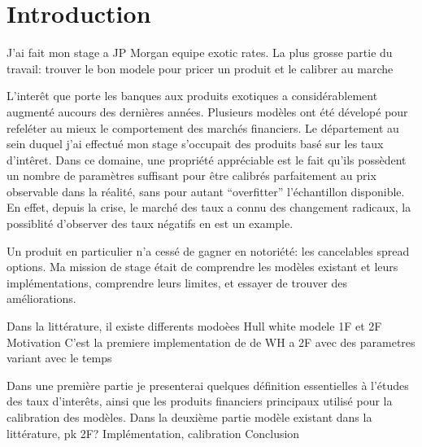 

\section{Introduction}

J'ai fait mon stage a JP Morgan equipe exotic rates.
La plus grosse partie du travail: trouver le bon modele pour pricer un produit et le calibrer au marche

L'interêt que porte les banques aux produits exotiques a considérablement augmenté aucours des dernières années. Plusieurs modèles ont été dévelopé pour refeléter au mieux le comportement des marchés financiers.
Le département au sein duquel j'ai effectué mon stage s'occupait des produits basé sur les taux d'intêret. Dans ce domaine, une propriété appréciable est le fait qu'ils possèdent un nombre de paramètres suffisant pour être calibrés parfaitement au prix observable dans la réalité, sans pour autant ``overfitter'' l'échantillon disponible. En effet, depuis la crise, le marché des taux a connu des changement radicaux, la possiblité d'observer des taux négatifs en est un example. 

Un produit en particulier n'a cessé de  gagner en notoriété: les cancelables spread options. Ma mission de stage était de comprendre les modèles existant et leurs implémentations, comprendre leurs limites, et essayer de trouver des améliorations.


Dans la littérature, il existe differents modoèes Hull white modele 1F et 2F 
Motivation
C'est la premiere implementation de de WH a 2F avec des parametres variant avec le temps


Dans une première partie je presenterai quelques définition essentielles à l'études des taux d'interêts, ainsi que les produits financiers principaux utilisé pour la calibration des modèles.
Dans la deuxième partie modèle existant dans la littérature, pk 2F?
Implémentation, calibration
Conclusion

